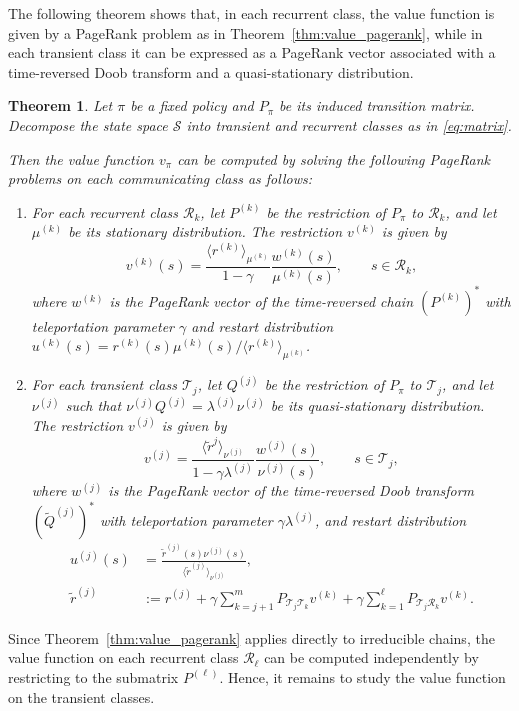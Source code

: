 \documentclass[letterpaper, 10 pt, conference]{ieeeconf}
\newcommand{\R}{\mathcal{R}}
\newcommand{\T}{\mathcal{T}}
\newtheorem{theorem}{Theorem}
\begin{document}
The following theorem shows that, in each recurrent class, the value function
is given by a PageRank problem as in
Theorem~\ref{thm:value_pagerank}, while in each transient class it can be expressed
as a PageRank vector associated with a time-reversed Doob transform and a
quasi-stationary distribution. 
\begin{theorem}
\label{thm:decomposition_pagerank}
Let $\pi$ be a fixed policy and $P_\pi$ be its induced transition matrix.
Decompose the state space $\mathcal S$ into transient and recurrent classes as in \eqref{eq:matrix}.

Then the value function $v_\pi$ can be computed by solving the following PageRank
problems on each communicating class as follows:
\begin{enumerate}
\item For each recurrent class $\R_k$, let $P^{(k)}$ be the restriction of $P_\pi$
to $\R_k$, and let $\mu^{(k)}$ be its stationary distribution.
The restriction $v^{(k)}$ is given by
$$
v^{(k)}(s) = \frac{\langle r^{(k)}\rangle_{\mu^{(k)}}}{1-\gamma}\frac{w^{(k)}(s)}{\mu^{(k)}(s)}, \qquad s \in \R_k,
$$
where $w^{(k)}$ is the PageRank vector of the time-reversed chain $(P^{(k)})^*$
with teleportation parameter $\gamma$ and restart distribution $u^{(k)}(s) = r^{(k)}(s) \mu^{(k)}(s) / \langle r^{(k)}\rangle_{\mu^{(k)}}$.

\item For each transient class $\T_j$, let $Q^{(j)}$ be the restriction of $P_\pi$
to $\T_j$, and let $\nu^{(j)}$ such that $\nu^{(j)} Q^{(j)} = \lambda^{(j)} \nu^{(j)}$ be its quasi-stationary
distribution.
The restriction $v^{(j)}$ is given by
$$
v^{(j)} = \frac{\langle \tilde r^{j}\rangle_{\nu^{(j)}}}{1-\gamma\lambda^{(j)}}\frac{w^{(j)}(s)}{\nu^{(j)}(s)}, \qquad s \in \T_j,
$$
where $w^{(j)}$ is the PageRank vector of the time-reversed Doob transform
$(\widetilde Q^{(j)})^*$ with teleportation parameter $\gamma \lambda^{(j)}$, and restart distribution 
\begin{align*}
    u^{(j)}(s) &= \frac{\tilde r^{(j)}(s)\nu^{(j)}(s)}{\langle \tilde r^{(j)} \rangle_{\nu^{(j)}}}, \\ \tilde r^{(j)} &:= r^{(j)} + \gamma\sum_{k=j+1}^{m} P_{\T_j\T_k} v^{(k)} + \gamma\sum_{k=1}^{\ell} P_{\T_j\R_k} v^{(k)}.
\end{align*}
\end{enumerate}
\end{theorem}

Since Theorem~\ref{thm:value_pagerank} applies directly to irreducible chains,
the value function on each recurrent class $\R_\ell$ can be computed independently
by restricting to the submatrix $P^{(\ell)}$.
Hence, it remains to study the value function on the transient classes.
\end{document}
